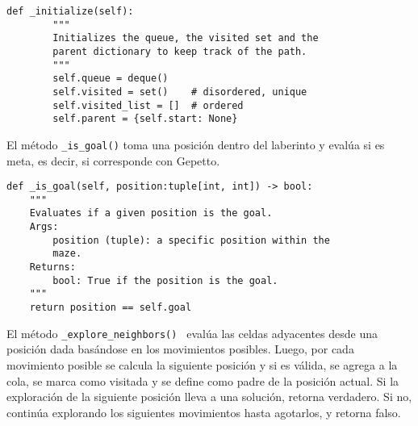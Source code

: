 \begin{lstlisting}
def _initialize(self):
        """
        Initializes the queue, the visited set and the 
        parent dictionary to keep track of the path.
        """
        self.queue = deque()
        self.visited = set()    # disordered, unique
        self.visited_list = []  # ordered
        self.parent = {self.start: None}
\end{lstlisting}
El método \lstinline{_is_goal()} toma una posición dentro del laberinto y evalúa si es meta, es decir, si corresponde con Gepetto.\\
\begin{lstlisting}
def _is_goal(self, position:tuple[int, int]) -> bool:
    """
    Evaluates if a given position is the goal.
    Args:
        position (tuple): a specific position within the
        maze.
    Returns:
        bool: True if the position is the goal.
    """
    return position == self.goal
\end{lstlisting}
\clearpage
El método \lstinline{_explore_neighbors() } evalúa las celdas adyacentes desde una posición dada basándose en los movimientos posibles. Luego, por cada movimiento posible se calcula la siguiente posición y si es válida, se agrega a la cola, se marca como visitada y se define como padre de la posición actual. Si la exploración de la siguiente posición lleva a una solución, retorna verdadero. Si no, continúa explorando los siguientes movimientos hasta agotarlos, y retorna falso.\\\

